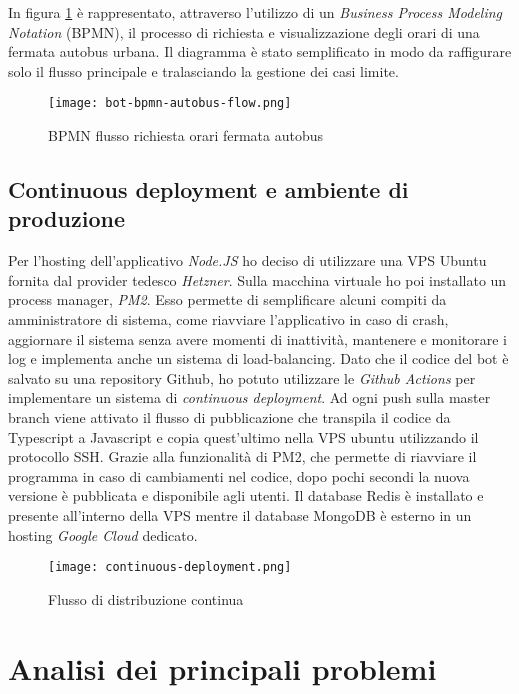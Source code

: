 \noindent In figura \ref{fig:bpmn_autobus_flow} è rappresentato, attraverso l'utilizzo di un \textit{Business Process Modeling Notation} (BPMN), il processo di richiesta e visualizzazione degli orari di una fermata autobus urbana. Il diagramma è stato semplificato in modo da raffigurare solo il flusso principale e tralasciando la gestione dei casi limite.

\begin{figure}[h]
\centering
\texttt{[image: bot-bpmn-autobus-flow.png]}
\caption{BPMN flusso richiesta orari fermata autobus}
\label{fig:bpmn_autobus_flow}
\end{figure}

\newpage
\newpage

\subsection{Continuous deployment e ambiente di produzione}
\label{sec:produzione}

Per l'hosting dell'applicativo \textit{Node.JS} ho deciso di utilizzare una VPS Ubuntu fornita dal provider tedesco \textit{Hetzner}. Sulla macchina virtuale ho poi installato un process manager, \textit{PM2}. Esso permette di semplificare alcuni compiti da amministratore di sistema, come riavviare l'applicativo in caso di crash, aggiornare il sistema senza avere momenti di inattività, mantenere e monitorare i log e implementa anche un sistema di load-balancing. Dato che il codice del bot è salvato su una repository Github, ho potuto utilizzare le \textit{Github Actions} per implementare un sistema di \textit{continuous deployment}. Ad ogni push sulla master branch viene attivato il flusso di pubblicazione che transpila il codice da Typescript a Javascript e copia quest'ultimo nella VPS ubuntu utilizzando il protocollo SSH. Grazie alla funzionalità di PM2, che permette di riavviare il programma in caso di cambiamenti nel codice, dopo pochi secondi la nuova versione è pubblicata e disponibile agli utenti. Il database Redis è installato e presente all'interno della VPS mentre il database MongoDB è esterno in un hosting \textit{Google Cloud} dedicato.

\begin{figure}[h]
\centering
\texttt{[image: continuous-deployment.png]}
\caption{Flusso di distribuzione continua}
\label{fig:continuous_deployment}
\end{figure}

\section{Analisi dei principali problemi}
\label{sec:problemi}


